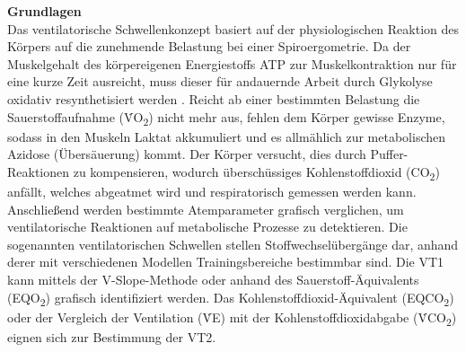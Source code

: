 \textbf{\Large Grundlagen}\\

Das ventilatorische Schwellenkonzept basiert auf der physiologischen Reaktion des Körpers auf die zunehmende Belastung bei einer Spiroergometrie. Da der Muskelgehalt des körpereigenen Energiestoffs ATP zur Muskelkontraktion nur für eine kurze Zeit ausreicht, muss dieser für andauernde Arbeit durch Glykolyse oxidativ resynthetisiert werden \cite{Kroidl.2015}. Reicht ab einer bestimmten Belastung die Sauerstoffaufnahme (\.{V}O\textsubscript{2}) nicht mehr aus, fehlen dem Körper gewisse Enzyme, sodass in den Muskeln Laktat akkumuliert und es allmählich zur metabolischen Azidose (Übersäuerung) kommt. Der Körper versucht, dies durch Puffer-Reaktionen zu kompensieren, wodurch überschüssiges Kohlenstoffdioxid (CO\textsubscript{2}) anfällt, welches abgeatmet wird und respiratorisch gemessen werden kann.\\
Anschließend werden bestimmte Atemparameter grafisch verglichen, um ventilatorische Reaktionen auf metabolische Prozesse zu detektieren. Die sogenannten ventilatorischen Schwellen stellen Stoffwechselübergänge dar, anhand derer mit verschiedenen Modellen Trainingsbereiche bestimmbar sind. Die VT1 kann mittels der V-Slope-Methode oder anhand des Sauerstoff-Äquivalents (EQO\textsubscript{2}) grafisch identifiziert werden. Das Kohlenstoffdioxid-Äquivalent (EQCO\textsubscript{2}) oder der Vergleich der Ventilation (\.{V}E) mit der Kohlenstoffdioxidabgabe (\.{V}CO\textsubscript{2}) eignen sich zur Bestimmung der VT2.\\

